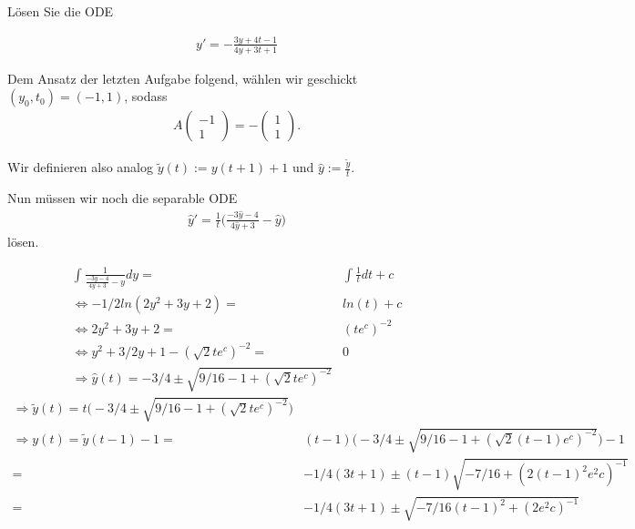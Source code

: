 \begin{exercise}
  Lösen Sie die ODE

  \begin{align*}
    y'= -\frac{3y + 4t - 1}{4y + 3t + 1}
  \end{align*}
\end{exercise}

\begin{solution}
  Dem Ansatz der letzten Aufgabe folgend, wählen wir geschickt $(y_0,t_0) = (-1,1)$, sodass
  \begin{align*}
  A\left(
  \begin{array}{c}
    -1 \\
    1
  \end{array}
  \right) = -\left(
  \begin{array}{c}
    1 \\
    1
  \end{array}
  \right).
  \end{align*}

  Wir definieren also analog $\tilde{y}(t) := y(t+1)+1$ und $\hat{y} := \frac{\tilde{y}}{t}$.

  Nun müssen wir noch die separable ODE
  \begin{align*}
    \hat{y}' = \frac{1}{t} \bigg(\frac{-3 \hat{y} -4}{4\hat{y}+3}-\hat{y}\bigg)
  \end{align*}
  lösen.

  \begin{align*}
    \int \frac{1}{\frac{-3y-4}{4y+3}-y}dy =& \int \frac{1}{t} dt + c \\
    \Leftrightarrow -1/2 ln(2y^2 +3y + 2) =& ln(t) + c \\
    \Leftrightarrow 2y^2 +3y + 2 =& (te^c)^{-2} \\
    \Leftrightarrow y^2 +3/2y + 1 - (\sqrt{2} te^c)^{-2} =& 0 \\
    \Rightarrow \hat{y}(t) = -3/4 \pm \sqrt{9/16 - 1 + (\sqrt{2} te^c)^{-2}}
  \end{align*}
  \begin{align*}
    \Rightarrow \tilde{y}(t) = t \bigg(-3/4 \pm \sqrt{9/16 - 1 + (\sqrt{2} te^c)^{-2}}\bigg) \\
    \Rightarrow y(t) = \tilde{y}(t-1) -1 =& (t-1) \bigg(-3/4 \pm \sqrt{9/16 - 1 + (\sqrt{2} (t-1)e^c)^{-2}}\bigg) - 1 \\
    =& -1/4 (3t+1) \pm (t-1) \sqrt{-7/16 + (2 (t-1)^2 e^2c)^{-1}} \\
    =& -1/4 (3t+1) \pm \sqrt{-7/16(t-1)^2 + (2e^2c)^{-1}}
  \end{align*}

\end{solution}

